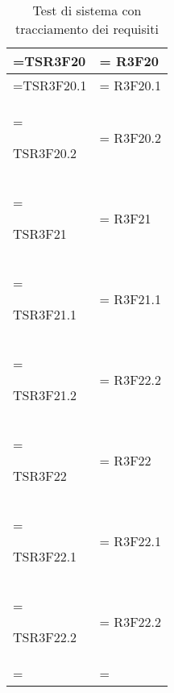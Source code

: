 \begin{xltabular}{\textwidth} {
            >{\hsize\linewidth=\hsize}X
            >{\hsize\linewidth=\hsize}X
        }
        TSR3F20 &
        R3F20
        \\ \hline

        TSR3F20.1 &
        R3F20.1
        \\ \hline

        TSR3F20.2 &
        R3F20.2
        \\ \hline

        TSR3F21 &
        R3F21
        \\ \hline

        TSR3F21.1 &
        R3F21.1
        \\ \hline

        TSR3F21.2 &
        R3F22.2 
        \\ \hline

        TSR3F22 &
        R3F22
        \\ \hline

        TSR3F22.1 &
        R3F22.1
        \\ \hline

        TSR3F22.2 &
        R3F22.2
        \\ \hline

        \caption{Test di sistema con tracciamento dei requisiti}
    \end{xltabular}

    \pagebreak